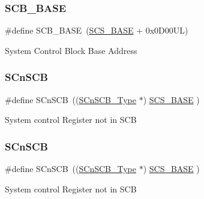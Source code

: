 \subsubsection{\texorpdfstring{SCB\_BASE}{SCB\_BASE}\hspace{0.1cm}{\footnotesize\ttfamily [6/6]}}
{\footnotesize\ttfamily \#define S\+C\+B\+\_\+\+B\+A\+SE~(\mbox{\hyperlink{group___c_m_s_i_s__core__base_ga3c14ed93192c8d9143322bbf77ebf770}{S\+C\+S\+\_\+\+B\+A\+SE}} +  0x0\+D00\+U\+L)}

System Control Block Base Address \mbox{\label{group___c_m_s_i_s__core__base_ga9fe0cd2eef83a8adad94490d9ecca63f}} 
\subsubsection{\texorpdfstring{SCnSCB}{SCnSCB}\hspace{0.1cm}{\footnotesize\ttfamily [1/4]}}
{\footnotesize\ttfamily \#define S\+Cn\+S\+CB~((\mbox{\hyperlink{struct_s_cn_s_c_b___type}{S\+Cn\+S\+C\+B\+\_\+\+Type}}    $\ast$)     \mbox{\hyperlink{group___c_m_s_i_s__core__base_ga3c14ed93192c8d9143322bbf77ebf770}{S\+C\+S\+\_\+\+B\+A\+SE}}      )}

System control Register not in S\+CB \mbox{\label{group___c_m_s_i_s__core__base_ga9fe0cd2eef83a8adad94490d9ecca63f}} 
\subsubsection{\texorpdfstring{SCnSCB}{SCnSCB}\hspace{0.1cm}{\footnotesize\ttfamily [2/4]}}
{\footnotesize\ttfamily \#define S\+Cn\+S\+CB~((\mbox{\hyperlink{struct_s_cn_s_c_b___type}{S\+Cn\+S\+C\+B\+\_\+\+Type}}    $\ast$)     \mbox{\hyperlink{group___c_m_s_i_s__core__base_ga3c14ed93192c8d9143322bbf77ebf770}{S\+C\+S\+\_\+\+B\+A\+SE}}      )}

System control Register not in S\+CB \mbox{\label{group___c_m_s_i_s__core__base_ga9fe0cd2eef83a8adad94490d9ecca63f}} 
